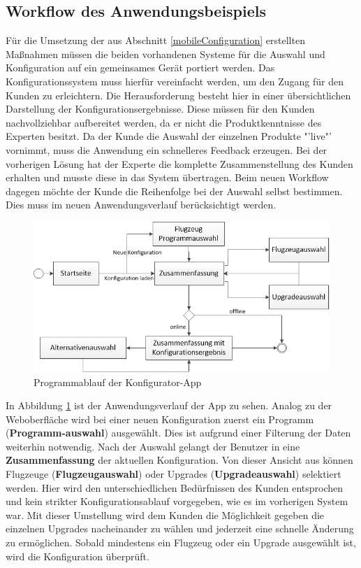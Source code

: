\subsection{Workflow des Anwendungsbeispiels}\label{workflowNew}
Für die Umsetzung der aus Abschnitt \ref{mobileConfiguration} erstellten Maßnahmen müssen die beiden vorhandenen Systeme für die Auswahl und Konfiguration auf ein gemeinsames Gerät portiert werden. Das Konfigurationssystem muss hierfür vereinfacht werden, um den Zugang für den Kunden zu erleichtern. Die Herausforderung besteht hier in einer übersichtlichen Darstellung der Konfigurationsergebnisse. Diese müssen für den Kunden nachvollziehbar aufbereitet werden, da er nicht die Produktkenntnisse des Experten besitzt. Da der Kunde die Auswahl der einzelnen Produkte "'live"' vornimmt, muss die Anwendung ein schnelleres Feedback erzeugen. Bei der vorherigen Lösung hat der Experte die komplette Zusammenstellung des Kunden erhalten und musste diese in das System übertragen. Beim neuen Workflow dagegen möchte der Kunde die Reihenfolge bei der Auswahl selbst bestimmen. Dies muss im neuen Anwendungsverlauf berücksichtigt werden. \par 
\begin{figure}
\centering
\includegraphics[width=\hsize]{images/workflow_app}
\caption{Programmablauf der Konfigurator-App}
\label{appWorkflow}
\end{figure}
In Abbildung \ref{appWorkflow} ist der Anwendungsverlauf der App zu sehen. Analog zu der Weboberfläche wird bei einer neuen Konfiguration zuerst ein Programm (\textbf{Programm-auswahl}) ausgewählt. Dies ist aufgrund einer Filterung der Daten weiterhin notwendig. Nach der Auswahl gelangt der Benutzer in eine \textbf{Zusammenfassung} der aktuellen Konfiguration. Von dieser Ansicht aus können Flugzeuge (\textbf{Flugzeugauswahl}) oder  Upgrades (\textbf{Upgradeauswahl}) selektiert werden. Hier wird den unterschiedlichen Bedürfnissen des Kunden entsprochen und kein strikter Konfigurationsablauf vorgegeben, wie es im vorherigen System war. Mit dieser Umstellung wird dem Kunden die Möglichkeit gegeben die einzelnen Upgrades nacheinander zu wählen und jederzeit eine schnelle Änderung zu ermöglichen. Sobald mindestens ein Flugzeug oder ein Upgrade ausgewählt ist, wird die Konfiguration überprüft. 
